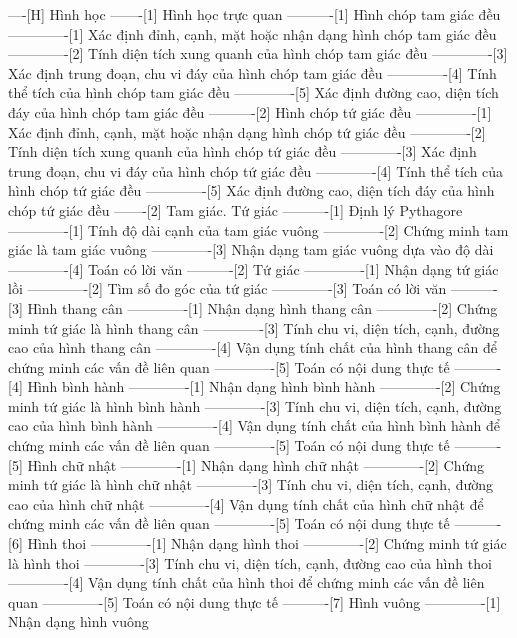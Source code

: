 ----[H] Hình học
-------[1] Hình học trực quan
----------[1] Hình chóp tam giác đều
-------------[1] Xác định đỉnh, cạnh, mặt hoặc nhận dạng hình chóp tam giác đều
-------------[2] Tính diện tích xung quanh của hình chóp tam giác đều
-------------[3] Xác định trung đoạn, chu vi đáy của hình chóp tam giác đều
-------------[4] Tính thể tích của hình chóp tam giác đều
-------------[5] Xác định đường cao, diện tích đáy của hình chóp tam giác đều
----------[2] Hình chóp tứ giác đều
-------------[1] Xác định đỉnh, cạnh, mặt hoặc nhận dạng hình chóp tứ giác đều
-------------[2] Tính diện tích xung quanh của hình chóp tứ giác đều
-------------[3] Xác định trung đoạn, chu vi đáy của hình chóp tứ giác đều
-------------[4] Tính thể tích của hình chóp tứ giác đều
-------------[5] Xác định đường cao, diện tích đáy của hình chóp tứ giác đều
-------[2] Tam giác. Tứ giác
----------[1] Định lý Pythagore
-------------[1] Tính độ dài cạnh của tam giác vuông
-------------[2] Chứng minh tam giác là tam giác vuông
-------------[3] Nhận dạng tam giác vuông dựa vào độ dài
-------------[4] Toán có lời văn
----------[2] Tứ giác
-------------[1] Nhận dạng tứ giác lồi
-------------[2] Tìm số đo góc của tứ giác
-------------[3] Toán có lời văn
----------[3] Hình thang cân
-------------[1] Nhận dạng hình thang cân
-------------[2] Chứng minh tứ giác là hình thang cân
-------------[3] Tính chu vi, diện tích, cạnh, đường cao của hình thang cân
-------------[4] Vận dụng tính chất của hình thang cân để chứng minh các vấn đề liên quan
-------------[5] Toán có nội dung thực tế
----------[4] Hình bình hành
-------------[1] Nhận dạng hình bình hành
-------------[2] Chứng minh tứ giác là hình bình hành
-------------[3] Tính chu vi, diện tích, cạnh, đường cao của hình bình hành
-------------[4] Vận dụng tính chất của hình bình hành để chứng minh các vấn đề liên quan
-------------[5] Toán có nội dung thực tế
----------[5] Hình chữ nhật
-------------[1] Nhận dạng hình chữ nhật
-------------[2] Chứng minh tứ giác là hình chữ nhật
-------------[3] Tính chu vi, diện tích, cạnh, đường cao của hình chữ nhật
-------------[4] Vận dụng tính chất của hình chữ nhật để chứng minh các vấn đề liên quan
-------------[5] Toán có nội dung thực tế
----------[6] Hình thoi
-------------[1] Nhận dạng hình thoi
-------------[2] Chứng minh tứ giác là hình thoi
-------------[3] Tính chu vi, diện tích, cạnh, đường cao của hình thoi
-------------[4] Vận dụng tính chất của hình thoi để chứng minh các vấn đề liên quan
-------------[5] Toán có nội dung thực tế
----------[7] Hình vuông
-------------[1] Nhận dạng hình vuông
